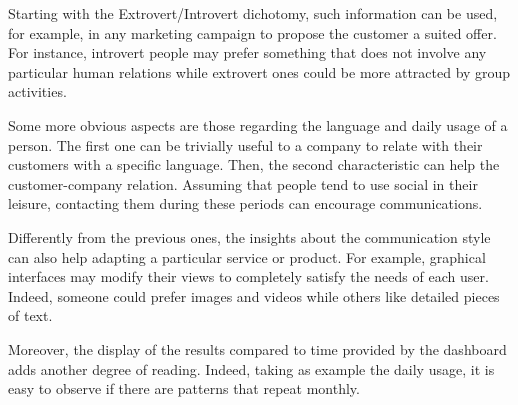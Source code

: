 Starting with the Extrovert/Introvert dichotomy, such information can be used, for example, in any marketing campaign to propose the customer a suited offer. For instance, introvert people may prefer something that does not involve any particular human relations while extrovert ones could be more attracted by group activities.

Some more obvious aspects are those regarding the language and daily usage of a person. The first one can be trivially useful to a company to relate with their customers with a specific language.
Then, the second characteristic can help the customer-company relation. Assuming that people tend to use social in their leisure, contacting them during these periods can encourage communications.

Differently from the previous ones, the insights about the communication style can also help adapting a particular service or product. For example, graphical interfaces may modify their views to completely satisfy the needs of each user. Indeed, someone could prefer images and videos while others like detailed pieces of text.

Moreover, the display of the results compared to time provided by the dashboard adds another degree of reading.
Indeed, taking as example the daily usage, it is easy to observe if there are patterns that repeat monthly.


